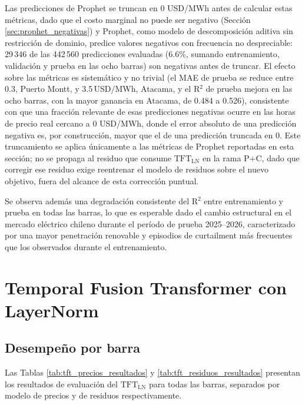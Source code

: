 Las predicciones de Prophet se truncan en 0 USD/MWh antes de calcular estas métricas, dado que el costo marginal no puede ser negativo (Sección \ref{sec:prophet_negativas}) y Prophet, como modelo de descomposición aditiva sin restricción de dominio, predice valores negativos con frecuencia no despreciable: 29\,346 de las 442\,560 predicciones evaluadas (6.6\%, sumando entrenamiento, validación y prueba en las ocho barras) son negativas antes de truncar. El efecto sobre las métricas es sistemático y no trivial (el MAE de prueba se reduce entre 0.3, Puerto Montt, y 3.5\,USD/MWh, Atacama, y el R$^2$ de prueba mejora en las ocho barras, con la mayor ganancia en Atacama, de 0.484 a 0.526), consistente con que una fracción relevante de esas predicciones negativas ocurre en las horas de precio real cercano a 0 USD/MWh, donde el error absoluto de una predicción negativa es, por construcción, mayor que el de una predicción truncada en 0. Este truncamiento se aplica únicamente a las métricas de Prophet reportadas en esta sección; no se propaga al residuo que consume $\text{TFT}_\text{LN}$ en la rama P+C, dado que corregir ese residuo exige reentrenar el modelo de residuos sobre el nuevo objetivo, fuera del alcance de esta corrección puntual.

Se observa además una degradación consistente del R$^2$ entre entrenamiento y prueba en todas las barras, lo que es esperable dado el cambio estructural en el mercado eléctrico chileno durante el período de prueba 2025--2026, caracterizado por una mayor penetración renovable y episodios de curtailment más frecuentes que los observados durante el entrenamiento.

\section{Temporal Fusion Transformer con LayerNorm}
 
\subsection{Desempeño por barra}
 
Las Tablas \ref{tab:tft_precios_resultados} y \ref{tab:tft_residuos_resultados} presentan los resultados de evaluación del $\text{TFT}_\text{LN}$ para todas las barras, separados por modelo de precios y de residuos respectivamente.
 
